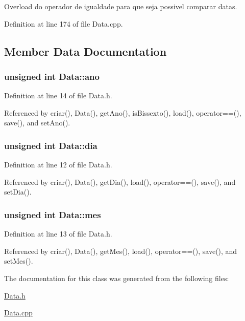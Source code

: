 Overload do operador de igualdade para que seja possivel comparar datas. 



Definition at line 174 of file Data.\+cpp.



\subsection{Member Data Documentation}
\hypertarget{class_data_a1811fab972bdf6ed644c4eb7412bd043}{
\subsubsection[{ano}]{\setlength{\rightskip}{0pt plus 5cm}unsigned int Data\+::ano\hspace{0.3cm}{\ttfamily [protected]}}}\label{class_data_a1811fab972bdf6ed644c4eb7412bd043}


Definition at line 14 of file Data.\+h.



Referenced by criar(), Data(), get\+Ano(), is\+Bissexto(), load(), operator==(), save(), and set\+Ano().

\hypertarget{class_data_a71a904380d17858da0b902e9a2563546}{
\subsubsection[{dia}]{\setlength{\rightskip}{0pt plus 5cm}unsigned int Data\+::dia\hspace{0.3cm}{\ttfamily [protected]}}}\label{class_data_a71a904380d17858da0b902e9a2563546}


Definition at line 12 of file Data.\+h.



Referenced by criar(), Data(), get\+Dia(), load(), operator==(), save(), and set\+Dia().

\hypertarget{class_data_a586deb479ec2031a0d3ceec8280f7706}{
\subsubsection[{mes}]{\setlength{\rightskip}{0pt plus 5cm}unsigned int Data\+::mes\hspace{0.3cm}{\ttfamily [protected]}}}\label{class_data_a586deb479ec2031a0d3ceec8280f7706}


Definition at line 13 of file Data.\+h.



Referenced by criar(), Data(), get\+Mes(), load(), operator==(), save(), and set\+Mes().



The documentation for this class was generated from the following files\+:\begin{DoxyCompactItemize}
\item 
\hyperlink{_data_8h}{Data.\+h}\item 
\hyperlink{_data_8cpp}{Data.\+cpp}\end{DoxyCompactItemize}
